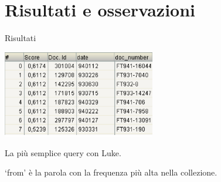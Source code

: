 \section{Risultati e osservazioni}
\begin{frame}{Risultati}
    \begin{center}
        \includegraphics[width=0.5\textwidth]{img/luke-2.png}

        \bigskip
        La più semplice query con Luke.

        `from' è la parola con la frequenza più alta nella collezione.
    \end{center}
\end{frame}
